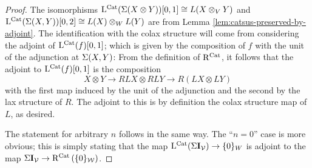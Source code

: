 \documentclass[12pt]{amsart}
\begin{document}
\begin{proof}
	The isomorphisms $\mathrm{L}^{\mathrm{Cat}}(\Sigma (X \otimes Y))[0,1] \cong L(X \otimes_V Y)$ and $\mathrm{L}^{\mathrm{Cat}}(\Sigma(X,Y))[0,2] \cong L(X) \otimes_W L(Y)$ are from Lemma \ref{lem:catsus-preserved-by-adjoint}.
	The identification with the colax structure will come from considering the adjoint of $\mathrm{L}^{\mathrm{Cat}}(f)[0,1]$; which is given by the composition of $f$ with the unit of the adjunction at $\Sigma(X,Y)$:
	From the definition of $\mathrm{R}^{\mathrm{Cat}}$, it follows that the adjoint to $\mathrm{L}^{\mathrm{Cat}}(f)[0,1]$ is the composition 
	$$X \otimes Y \to  RLX \otimes RL Y \to R(LX \otimes LY)$$
	with the first map induced by the unit of the adjunction and the second by the lax structure of $R$. The adjoint to this is by definition the colax structure map of $L$, as desired.
	\par 
	The statement for arbitrary $n$ follows in the same way. 
	The ``$n = 0$'' case is more obvious; this is simply stating that the map $\mathrm{L}^{\mathrm{Cat}}(\Sigma \mathbf{I}_\mathcal{V}) \to \{0\}_W $ is adjoint to the map $\Sigma \mathbf{I}_\mathcal{V} \to \mathrm{R}^{\mathrm{Cat}} \left (\{ 0\}_\mathcal{W} \right)$. 
\end{proof}
\end{document}
